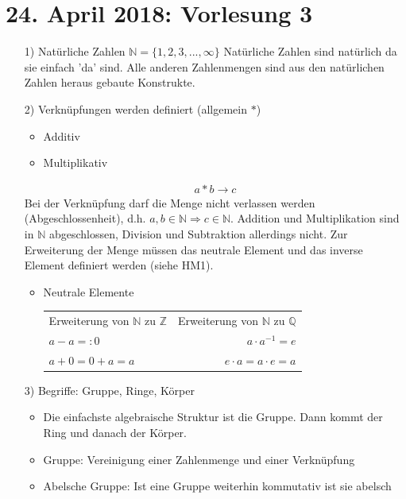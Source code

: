 \documentclass[12pt,a4paper]{report}%
\numberwithin{equation}{section}
\newcommand{\N}{\mathbb{N}}
\newcommand{\Z}{\mathbb{Z}}
\newcommand{\Q}{\mathbb{Q}}
\numberwithin{equation}{subsection}
\begin{document}
	\section{24. April 2018: Vorlesung 3}
	  \begin{itemize}
	    \item[1) ] Natürliche Zahlen $\N = \lbrace 1,2,3,...,\infty \rbrace$\newline
	      Natürliche Zahlen sind natürlich da sie einfach 'da' sind. Alle anderen Zahlenmengen sind aus den natürlichen Zahlen heraus gebaute Konstrukte.
	    \item[2) ] Verknüpfungen werden definiert (allgemein $*$)
	    \begin{itemize}
	      \item Additiv
	      \item Multiplikativ
	    \end{itemize}
	    \begin{align*}
	      a * b \rightarrow c 
	    \end{align*}
	      Bei der Verknüpfung darf die Menge nicht verlassen werden (Abgeschlossenheit), d.h. $a,b \in \N \Rightarrow c \in \N$. \newline
	      Addition und Multiplikation sind in $\N$ abgeschlossen, Division und Subtraktion allerdings nicht. Zur Erweiterung der Menge müssen das neutrale Element und das inverse Element definiert werden (siehe HM1).
	      \begin{itemize}
	        \item Neutrale Elemente $\qquad$
	        \begin{tabular}{l | r}
	          Erweiterung von $\N$ zu $\Z$ & Erweiterung von $\N$ zu $\Q$\\
	          $a - a =: 0$                 & $a \cdot a^{-1} = e$ \\
	          $a + 0 = 0 + a = a $         & $e \cdot a = a \cdot e = a$ 
	        \end{tabular}
	      \end{itemize}
	    \item[3) ] Begriffe: Gruppe, Ringe, Körper
		    \begin{itemize}
		      \item Die einfachste algebraische Struktur ist die Gruppe. Dann kommt der Ring und danach der Körper.
		      \item Gruppe: Vereinigung einer Zahlenmenge und einer Verknüpfung
		      \item Abelsche Gruppe: Ist eine Gruppe weiterhin kommutativ ist sie abelsch

\end{itemize}
\end{itemize}
\end{document}
